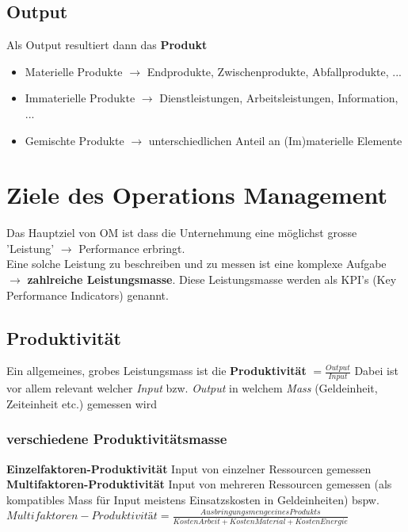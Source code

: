 \documentclass{report}
\theoremstyle{definition}
\theoremstyle{example}
\begin{document}
   \subsection{Output}
Als Output resultiert dann das \textbf{Produkt}
\begin{itemize}
   \item Materielle Produkte $\rightarrow$ Endprodukte, Zwischenprodukte, Abfallprodukte, ...
   \item Immaterielle Produkte $\rightarrow$ Dienstleistungen, Arbeitsleistungen, Information, ...
   \item Gemischte Produkte $\rightarrow$ unterschiedlichen Anteil an (Im)materielle Elemente
\end{itemize}

\section{Ziele des Operations Management}
Das Hauptziel von OM ist dass die Unternehmung eine möglichst grosse 'Leistung' $\rightarrow$ Performance erbringt.\\
Eine solche Leistung zu beschreiben und zu messen ist eine komplexe Aufgabe $\rightarrow$ \textbf{zahlreiche Leistungsmasse}.
Diese Leistungsmasse werden als KPI's (Key Performance Indicators) genannt. \\
   \subsection{Produktivität}
Ein allgemeines, grobes Leistungsmass ist die \textbf{Produktivität} $ = \frac{Output}{Input}$
Dabei ist vor allem relevant welcher \textit{Input} bzw. \textit{Output} in welchem \textit{Mass} (Geldeinheit, Zeiteinheit etc.) gemessen wird

      \subsubsection{verschiedene Produktivitätsmasse}
\textbf{Einzelfaktoren-Produktivität} Input von einzelner Ressourcen gemessen\\

\textbf{Multifaktoren-Produktivität} Input von mehreren Ressourcen gemessen (als kompatibles Mass für Input meistens Einsatzskosten in Geldeinheiten) bspw.\\
$Multifaktoren-Produktivität = \frac{Ausbringungsmenge eines Produkts}{Kosten Arbeit + Kosten Material + Kosten Energie}$
\end{document}
